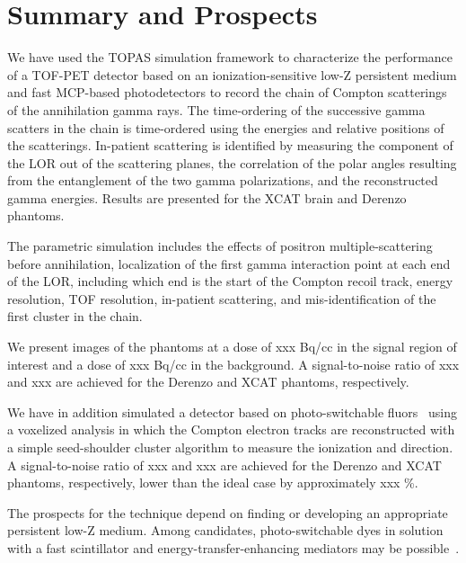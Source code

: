 \documentclass[12pt]{article}
\begin{document}

\clearpage
\section{Summary and Prospects}
\label{Summary}
We have used the TOPAS simulation framework to characterize the performance of a TOF-PET detector based on an ionization-sensitive low-Z persistent medium and fast MCP-based photodetectors to record the chain of Compton scatterings of the annihilation gamma rays. The time-ordering of the successive gamma scatters in the chain is time-ordered using the energies and relative positions of the scatterings. In-patient scattering is identified by measuring the component of the LOR out of the scattering planes, the correlation of the polar angles resulting from the entanglement of the two gamma polarizations, and the reconstructed gamma energies. Results are presented for the XCAT brain and  Derenzo phantoms.

The parametric simulation includes the effects of positron multiple-scattering before annihilation, localization of the first gamma interaction point at each end of the LOR, including which end is the start of the Compton recoil track,
energy resolution, TOF resolution, in-patient scattering, and mis-identification of the first cluster in the chain.

We present images of the phantoms at a dose of xxx Bq/cc in the signal region of interest and a dose of xxx Bq/cc in the background. A signal-to-noise ratio of xxx and xxx are achieved for the Derenzo and XCAT phantoms, respectively.

We have in addition simulated a detector based on photo-switchable fluors~\cite{PET_NIM_paper} using a voxelized analysis in which the Compton electron tracks are reconstructed with a simple seed-shoulder cluster algorithm to measure the ionization and direction.  A signal-to-noise ratio of xxx and xxx are achieved for the Derenzo and XCAT phantoms, respectively, lower than the ideal case by approximately xxx \%.

The prospects for the technique depend on finding or developing an appropriate persistent low-Z medium. Among candidates, photo-switchable dyes in solution with a fast scintillator and energy-transfer-enhancing mediators may be possible~\cite{Eric_CPAD}.
\end{document}
